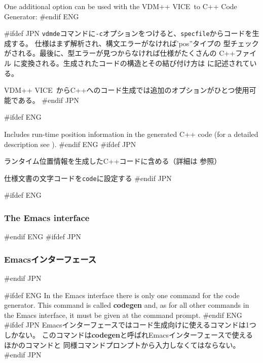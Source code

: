 \documentclass[\pformat,12pt]{article}
\newcommand{\vdmslpp}{VDM-SL}
\newcommand{\vdmslpp}{VDM++}
\renewcommand{\vdmslpp}{VDM++ VICE}
\begin{document}
One additional option can be used with the \vdmslpp\ to C++ Code
Generator:
#endif ENG

#ifdef JPN
{\tt vdmde}コマンドに{\tt -c}オプションをつけると、{\tt specfile}からコードを生成する。
仕様はまず解析され、構文エラーがなければ'pos''タイプの
型チェック がされる。最後に、型エラーが見つからなければ仕様がたくさんの
C++ファイル に変換される。生成されたコードの構造とその結び付け方は
に記述されている。

\vdmslpp\ からC++へのコード生成では追加のオプションがひとつ使用可能である。
#endif JPN

\begin{description}
#ifdef ENG
\item[{\tt -r}] Includes run-time position information in the
  generated C++ code (for a detailed description see
  ).
#endif ENG
#ifdef JPN
\item[{\tt -r}]
  ランタイム位置情報を生成したC++コードに含める（詳細は
  参照）

\item[{\tt -W code}] 仕様文書の文字コードを{\tt code}に設定する
#endif JPN
\end{description}

#ifdef ENG
\subsubsection{The Emacs interface}
#endif ENG
#ifdef JPN
\subsubsection{Emacsインターフェース}
#endif JPN

#ifdef ENG
In the Emacs interface there is only one command for the code generator.
This command is called \textbf{codegen}
and, as for all other commands in the Emacs interface, it must be given at
the command prompt.
#endif ENG
#ifdef JPN
Emacsインターフェースではコード生成向けに使えるコマンドは1つしかない。
このコマンドは\textbf{codegen}と呼ばれEmacsインターフェースで使えるほかのコマンドと
同様コマンドプロンプトから入力しなくてはならない。
#endif JPN
\end{document}
